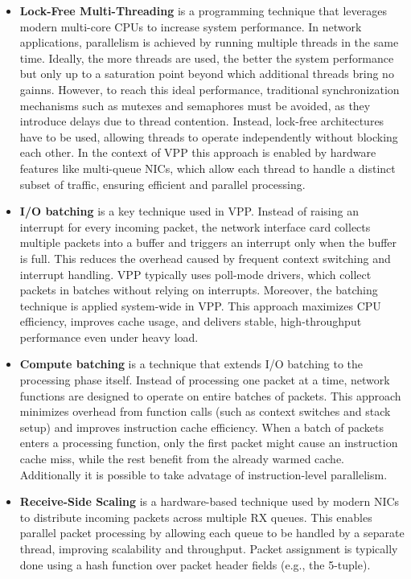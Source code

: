 \begin{itemize}
  \item \textbf{Lock-Free Multi-Threading}
is a programming technique that leverages modern multi-core CPUs to increase system performance. In network applications, parallelism is achieved by running multiple threads in the same time. 
Ideally, the more threads are used, the better the system performance but only up to a saturation point beyond which additional threads bring no gainns. 
However, to reach this ideal performance, traditional synchronization mechanisms such as mutexes and semaphores must be avoided, as they introduce delays due to thread contention. 
Instead, lock-free architectures have to be used, allowing threads to operate independently without blocking each other. 
In the context of VPP this approach is enabled by hardware features like multi-queue NICs, 
which allow each thread to handle a distinct subset of traffic, ensuring efficient and parallel processing.~\cite{LINGUAGLOSSA}

  \item \textbf{I/O batching}
is a key technique used in VPP. 
Instead of raising an interrupt for every incoming packet, the network interface card collects multiple packets into a buffer and triggers an interrupt only when the buffer is full. 
This reduces the overhead caused by frequent context switching and interrupt handling. 
VPP typically uses poll-mode drivers, which collect packets in batches without relying on interrupts. 
Moreover, the batching technique is applied system-wide in VPP. 
This approach maximizes CPU efficiency, improves cache usage, and delivers stable, high-throughput performance even under heavy load.~\cite{LINGUAGLOSSA}

  \item \textbf{Compute batching} 
is a technique that extends I/O batching to the processing phase itself. 
Instead of processing one packet at a time, network functions are designed to operate on entire batches of packets. 
This approach minimizes overhead from function calls (such as context switches and stack setup) and improves instruction cache efficiency. 
When a batch of packets enters a processing function, only the first packet might cause an instruction cache miss, while the rest benefit from the already warmed cache.
Additionally it is possible to take advatage of instruction-level parallelism.~\cite{LINGUAGLOSSA}
  
  \item \textbf{Receive-Side Scaling}
is a hardware-based technique used by modern NICs to distribute incoming packets across multiple RX queues. 
This enables parallel packet processing by allowing each queue to be handled by a separate thread, improving scalability and throughput. 
Packet assignment is typically done using a hash function over packet header fields (e.g., the 5-tuple).~\cite{LINGUAGLOSSA}


\end{itemize}
